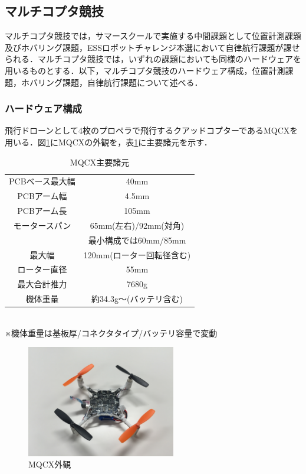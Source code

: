 \documentclass[submit]{ipsj}
\begin{document}
\subsection{マルチコプタ競技}
マルチコプタ競技では，サマースクールで実施する中間課題として位置計測課題及びホバリング課題，ESSロボットチャレンジ本選において自律航行課題が課せられる．マルチコプタ競技では，いずれの課題においても同様のハードウェアを用いるものとする．以下，マルチコプタ競技のハードウェア構成，位置計測課題，ホバリング課題，自律航行課題について述べる．

\subsubsection{ハードウェア構成}
飛行ドローンとして4枚のプロペラで飛行するクアッドコプターであるMQCX\cite{mqcx}を用いる．図\ref{fig:mqcx}にMQCXの外観を，表\ref{table:mqcx}に主要諸元を示す．

\begin{table}[htb]
\caption{MQCX主要諸元} \label{table:mqcx}
\centering
\begin{tabular}{c|c}\hline
PCBベース最大幅 & 40mm \\
PCBアーム幅 & 4.5mm\\
PCBアーム長 & 105mm\\
モータースパン & 65mm(左右)/92mm(対角)\\
& 最小構成では60mm/85mm\\
最大幅 & 120mm(ローター回転径含む)\\
ローター直径 & 55mm\\
最大合計推力 & 7680g\\
機体重量 & 約34.3g〜(バッテリ含む)\\ \hline
\end{tabular}\\
※機体重量は基板厚/コネクタタイプ/バッテリ容量で変動
\end{table}

\begin{figure}[htb]
\centering
\includegraphics[width=6.5cm]{images/mqcx.jpg}
\caption{MQCX外観} \label{fig:mqcx}
\end{figure}
\end{document}
